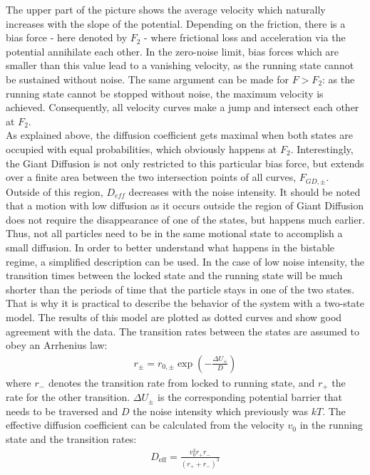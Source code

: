 \documentclass[12pt,a4paper]{article}
\begin{document}
The upper part of the picture shows the average velocity which naturally increases with the slope of the potential. Depending on the friction, there is a bias force - here denoted by $F_2$ - where frictional loss and acceleration via the potential annihilate each other. In the zero-noise limit, bias forces which are smaller than this value lead to a vanishing velocity, as the running state cannot be sustained without noise. The same argument can be made for $F>F_2$: as the running state cannot be stopped without noise, the maximum velocity is achieved. Consequently, all velocity curves make a jump and intersect each other at $F_2$.\\
As explained above, the diffusion coefficient gets maximal when both states are occupied with equal probabilities, which obviously happens at $F_2$. Interestingly, the Giant Diffusion is not only restricted to this particular bias force, but extends over a finite area between the two intersection points of all curves, $F_{GD,\pm}$. Outside of this region, $D_{eff}$ decreases with the noise intensity. It should be noted that a motion with low diffusion as it occurs outside the region of Giant Diffusion does not require the disappearance of one of the states, but happens much earlier. Thus, not all particles need to be in the same motional state to accomplish a small diffusion.
In order to better understand what happens in the bistable regime, a simplified description can be used. 
In the case of low noise intensity, the transition times between the locked state and the running state will be much shorter than the periods of time that the particle stays in one of the two states. That is why it is practical to describe the behavior of the system with a two-state model. The results of this model are plotted as dotted curves and show good agreement with the data. The transition rates between the states are assumed to obey an Arrhenius law:
\begin{align}\label{arrhlaw}
r_{\pm}=r_{0,\pm}\exp\left(-\frac{\Delta U_{\pm}}{D}\right)
\end{align}
where $r_-$ denotes the transition rate from locked to running state, and $r_+$ the rate for the other transition. $\Delta U_{\pm}$ is the corresponding potential barrier that needs to be traversed and $D$ the noise intensity which previously was $kT$. The effective diffusion coefficient can be calculated from the velocity $v_0$ in the running state and the transition rates\cite{abp}: 
\begin{align*}
D_{\text{eff}}=\frac{v_0^2 r_+r_-}{(r_++r_-)^3}
\end{align*}
\end{document}
